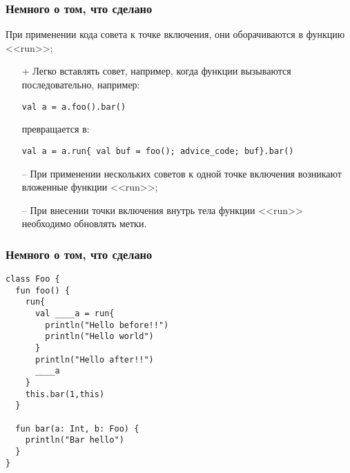 \documentclass{beamer}
\begin{document}
    \begin{frame}[fragile=singleslide]
    	\frametitle{Немного о том, что сделано}
    	При применении кода совета к точке включения, они оборачиваются в
    	функцию <<run>>;
    	\begin{itemize}
    		\item[+] Легко вставлять совет, например, когда функции вызываются
    		  последовательно, например:
    		  \begin{verbatim}
val a = a.foo().bar()
    		  \end{verbatim}
    		  превращается в:
    		  \begin{verbatim}
val a = a.run{ val buf = foo(); advice_code; buf}.bar()
    		  \end{verbatim}
    		\item [--] При применении нескольких советов к одной точке включения
    		  возникают вложенные функции <<run>>;
    		\item [--] При внесении точки включения внутрь тела функции <<run>>
    		  необходимо обновлять метки.
    	\end{itemize}
    \end{frame}

    \begin{frame}[fragile=singleslide]
    	\frametitle{Немного о том, что сделано}
    		\begin{verbatim}
class Foo {
  fun foo() {
    run{
      val ____a = run{
        println("Hello before!!")
        println("Hello world")
      }
      println("Hello after!!")
      ____a
    }
    this.bar(1,this)
  }

  fun bar(a: Int, b: Foo) {
    println("Bar hello")
  }
}
    	\end{verbatim}
    \end{frame}
\end{document}
